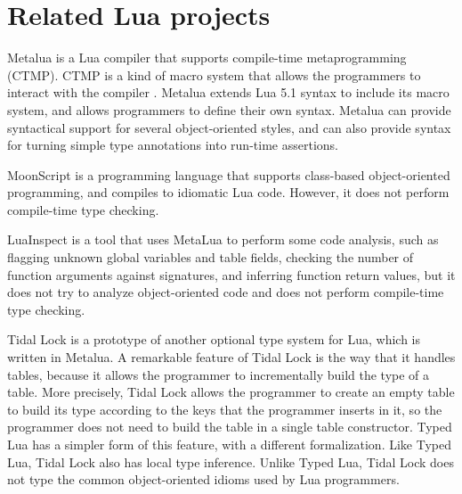 \section{Related Lua projects}

Metalua \citep{metalua} is a Lua compiler that supports compile-time
metaprogramming (CTMP).
CTMP is a kind of macro system that allows the programmers to interact
with the compiler \citep{fleutot2007contrasting}. 
Metalua extends Lua 5.1 syntax to include its macro system,
and allows programmers to define their own syntax.
Metalua can provide syntactical support for several object-oriented
styles, and can also provide syntax for turning simple type
annotations into run-time assertions.

MoonScript \citep{moonscript} is a programming language that supports
class-based object-oriented programming, and compiles to idiomatic
Lua code.
However, it does not perform compile-time type checking.

LuaInspect \citep{luainspect} is a tool that uses MetaLua to perform
some code analysis, such as flagging unknown global variables and
table fields, checking the number of function arguments against
signatures, and inferring function return values, but it does not
try to analyze object-oriented code and does not perform compile-time
type checking.

Tidal Lock \citep{tidallock} is a prototype of another optional type
system for Lua, which is written in Metalua.
A remarkable feature of Tidal Lock is the way that it handles tables,
because it allows the programmer to incrementally build the type of
a table.
More precisely, Tidal Lock allows the programmer to create an empty
table to build its type according to the keys that the programmer
inserts in it, so the programmer does not need to build the table in
a single table constructor.
Typed Lua has a simpler form of this feature, with a different
formalization.
Like Typed Lua, Tidal Lock also has local type inference.
Unlike Typed Lua, Tidal Lock does not type the common object-oriented
idioms used by Lua programmers.

